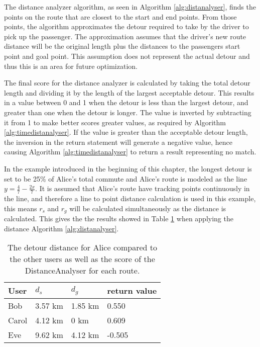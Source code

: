 The distance analyzer algorithm, as seen in Algorithm \ref{alg:distanalyser}, finds the points on the route that are closest to the start and end points.
From those points, the algorithm approximates the detour required to take by the driver to pick up the passenger.
The approximation assumes that the driver's new route distance will be the original length plus the distances to the passengers start point and goal point.
This assumption does not represent the actual detour and thus this is an area for future optimization.

The final score for the distance analyzer is calculated by taking the total detour length and dividing it by the length of the largest acceptable detour.
This results in a value between 0 and 1 when the detour is less than the largest detour, and greater than one when the detour is longer.
The value is inverted by subtracting it from 1 to make better scores greater values, as required by Algorithm \ref{alg:timedistanalyser}.
If the value is greater than the acceptable detour length, the inversion in the return statement will generate a negative value, hence causing Algorithm \ref{alg:timedistanalyser} to return a result representing no match.

In the example introduced in the beginning of this chapter, the longest detour is set to be 25\% of Alice's total commute and Alice's route is modeled as the line  $y = \frac{4}{7}-\frac{2 x}{7}$.
It is assumed that Alice's route have tracking points continuously in the line, and therefore a line to point distance calculation is used in this example, this means $r_s$ and $r_g$ will be calculated simultaneously as the distance is calculated.
This gives the the results showed in Table \ref{tbl:distance} when applying the distance  Algorithm \ref{alg:distanalyser}.

\begin{table}[!ht]
\centering
\begin{tabular}{@{}llll@{}}
\toprule
\textbf{User} 	& \textbf{$d_s$} & \textbf{$d_g$} 	& \textbf{return value} 	\\ \midrule
Bob         	& 3.57 km        & 1.85 km	    	& 0.550		 			\\
Carol         	& 4.12 km        & 0 km       		& 0.609        		\\
Eve           	& 9.62 km        & 4.12 km		    & -0.505        		\\ \bottomrule
\end{tabular}
\caption{The detour distance for Alice compared to the other users as well as the score of the DistanceAnalyser for each route.}
\label{tbl:distance}
\end{table}

